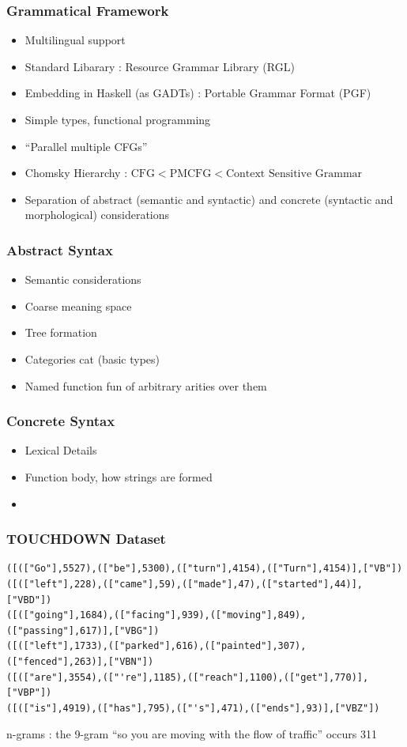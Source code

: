 \documentclass{beamer}
\begin{document}
\begin{frame}
\frametitle{Grammatical Framework}
\begin{itemize}[<+->]
\item Multilingual support
\item Standard Libarary : Resource Grammar Library (RGL)
\item Embedding in Haskell (as GADTs) : Portable Grammar Format (PGF)
\item Simple types, functional programming
\item ``Parallel multiple CFGs''
\item Chomsky Hierarchy : $\text{CFG} < \text{PMCFG} < \text{Context Sensitive Grammar}$
\item Separation of abstract (semantic and syntactic) and concrete (syntactic and
 morphological) considerations
\end{itemize}
\end{frame}

\begin{frame}
\frametitle{Abstract Syntax}
\begin{itemize}[<+->]
\item Semantic considerations
\item Coarse meaning space
\item Tree formation
\item Categories cat (basic types)
\item Named function fun of arbitrary arities over them
\end{itemize}
\end{frame}

\begin{frame}
\frametitle{Concrete Syntax}
\begin{itemize}[<+->]
\item Lexical Details
\item Function body, how strings are formed
\item 
\end{itemize}
\end{frame}

\begin{frame}[fragile]
\frametitle{TOUCHDOWN Dataset}
\fontsize{9pt}{10pt}\selectfont

\begin{verbatim}
([(["Go"],5527),(["be"],5300),(["turn"],4154),(["Turn"],4154)],["VB"])
([(["left"],228),(["came"],59),(["made"],47),(["started"],44)],["VBD"])
([(["going"],1684),(["facing"],939),(["moving"],849),(["passing"],617)],["VBG"])
([(["left"],1733),(["parked"],616),(["painted"],307),(["fenced"],263)],["VBN"])
([(["are"],3554),(["'re"],1185),(["reach"],1100),(["get"],770)],["VBP"])
([(["is"],4919),(["has"],795),(["'s"],471),(["ends"],93)],["VBZ"])
\end{verbatim}

n-grams : the 9-gram ``so you are moving with the flow of traffic'' occurs 311

\end{frame}
\end{document}
